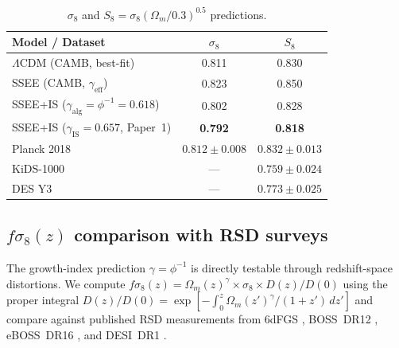 \documentclass[12pt,a4paper]{article}
\begin{document}
\begin{table}[ht]
\centering
\caption{$\sigma_8$ and $S_8=\sigma_8(\Omega_m/0.3)^{0.5}$ predictions.}
\label{tab:sigma8}
\begin{tabular}{lcc}
\hline
Model / Dataset & $\sigma_8$ & $S_8$ \\
\hline
$\Lambda$CDM (CAMB, best-fit) & 0.811 & 0.830 \\
SSEE (CAMB, $\gamma_\mathrm{eff}$) & 0.823 & 0.850 \\
SSEE+IS ($\gamma_\mathrm{alg}=\phi^{-1}=0.618$) & 0.802 & 0.828 \\
SSEE+IS ($\gamma_\mathrm{IS}=0.657$, Paper~1) & \textbf{0.792} & \textbf{0.818} \\
\hline
Planck 2018 \citep{Planck2020} & $0.812\pm0.008$ & $0.832\pm0.013$ \\
KiDS-1000 \citep{Asgari2021} & --- & $0.759\pm0.024$ \\
DES Y3 \citep{DES2022} & --- & $0.773\pm0.025$ \\
\hline
\end{tabular}
\end{table}

\subsection{\texorpdfstring{$f\sigma_8(z)$}{fsig8} comparison with RSD surveys}
\label{sec:fsig8}

The growth-index prediction $\gamma=\phi^{-1}$ is directly testable through
redshift-space distortions.  We compute $f\sigma_8(z) = \Omega_m(z)^\gamma \times
\sigma_8 \times D(z)/D(0)$ using the proper integral
$D(z)/D(0) = \exp\!\left[-\int_0^z \Omega_m(z')^\gamma/(1+z')\,dz'\right]$
and compare against published RSD measurements from
6dFGS \citep{Beutler2012}, BOSS~DR12 \citep{Alam2017},
eBOSS~DR16 \citep{Alam2021,deMattia2021}, and DESI~DR1 \citep{DESI2024FS}.
\end{document}
